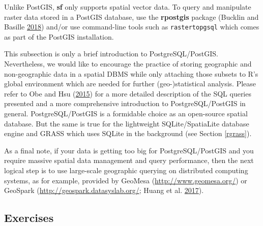 \documentclass[]{krantz}
\begin{document}
Unlike PostGIS, \textbf{sf} only supports spatial vector data.
To query and manipulate raster data stored in a PostGIS database, use the \textbf{rpostgis} package (Bucklin and Basille \protect\hyperlink{ref-bucklin_rpostgis_2018}{2018}) and/or use command-line tools such as \texttt{rastertopgsql} which comes as part of the PostGIS installation.

This subsection is only a brief introduction to PostgreSQL/PostGIS.
Nevertheless, we would like to encourage the practice of storing geographic and non-geographic data in a spatial DBMS while only attaching those subsets to R's global environment which are needed for further (geo-)statistical analysis.
Please refer to Obe and Hsu (\protect\hyperlink{ref-obe_postgis_2015}{2015}) for a more detailed description of the SQL queries presented and a more comprehensive introduction to PostgreSQL/PostGIS in general.
PostgreSQL/PostGIS is a formidable choice as an open-source spatial database.
But the same is true for the lightweight SQLite/SpatiaLite database engine and GRASS which uses SQLite in the background (see Section \ref{rgrass}).

As a final note, if your data is getting too big for PostgreSQL/PostGIS and you require massive spatial data management and query performance, then the next logical step is to use large-scale geographic querying on distributed computing systems, as for example, provided by GeoMesa (\url{http://www.geomesa.org/}) or GeoSpark (\url{http://geospark.datasyslab.org/}; Huang et al. \protect\hyperlink{ref-huang_geospark_2017}{2017}).

\hypertarget{exercises-7}{%
\subsection{Exercises}\label{exercises-7}}
\end{document}
